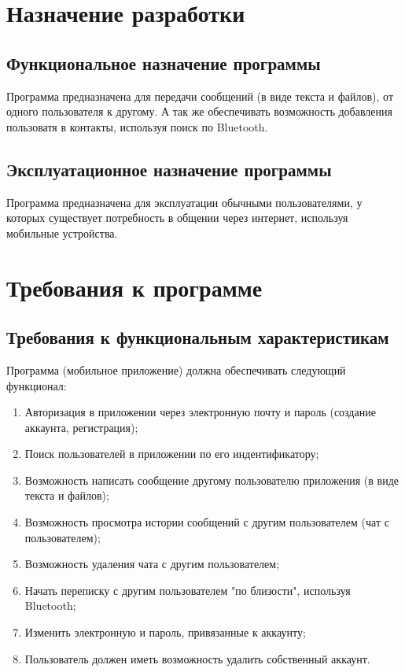 \documentclass[techtask]{espd}
\begin{document}
\section{Назначение разработки}
\subsection{Функциональное назначение программы}
Программа предназначена для передачи сообщений (в виде текста и файлов), от одного пользователя к другому. А так же обеспечивать возможность добавления пользоватя в контакты, используя поиск по Bluetooth.

\subsection{Эксплуатационное назначение программы}
Программа предназначена для эксплуатации обычными пользователями, у которых существует потребность в общении через интернет, используя мобильные устройства.

\section{Требования к программе}
\subsection{Требования к функциональным характеристикам}

Программа (мобильное приложение) должна обеспечивать следующий функционал:

\begin{enumerate}
\item Авторизация в приложении через электронную почту и пароль (создание аккаунта, регистрация);
\item Поиск пользователей в приложении по его индентификатору;
\item Возможность написать сообщение другому пользователю приложения (в виде текста и файлов);
\item Возможность просмотра истории сообщений с другим пользователем (чат с пользователем);
\item Возможность удаления чата с другим пользователем;
\item Начать переписку с другим пользователем "по близости", используя Bluetooth;
\item Изменить электронную и пароль, привязанные к аккаунту;
\item Пользователь должен иметь возможность удалить собственный аккаунт.
\end{enumerate}
\end{document}
